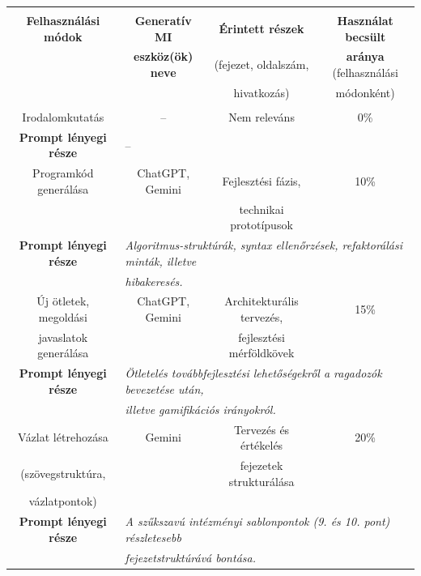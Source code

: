 {\small
	{\noindent
		\begin{tabular}{|c|c|c|c|}\hline
			\hspace{40mm} & \hspace{30mm} & \hspace{30mm} & \hspace{30mm} \\ 
			\textbf{Felhasználási módok}	& \textbf{Generatív MI} 	& \textbf{Érintett részek} 	& \textbf{Használat becsült} \\
			& \textbf{eszköz(ök) neve} & (fejezet, oldalszám, & \textbf{aránya} (felhasználási \\ 
			& & hivatkozás) & módonként) \\
			\hspace{40mm} & \hspace{30mm} & \hspace{30mm} & \hspace{30mm} \\ \hline \hline

			Irodalomkutatás & -- & Nem releváns & 0\% \\ \hline
			\textbf{Prompt lényegi része}  &\multicolumn{3}{|l|}{--} \\ \hline \hline

			Programkód generálása 	& ChatGPT, Gemini 	& Fejlesztési fázis,\newline 	& 10\% \\
								& 				&  technikai prototípusok 	& \\ \hline
			\textbf{Prompt lényegi része } & \multicolumn{3}{|l|}{\textit{Algoritmus-struktúrák, syntax ellenőrzések, refaktorálási minták, illetve}} \\
								& \multicolumn{3}{|l|}{\textit{hibakeresés.}} \\ \hline \hline

			Új ötletek, megoldási 		& ChatGPT, Gemini 	& Architekturális tervezés,	& 15\% 	\\ 
			javaslatok generálása 		& 				& fejlesztési mérföldkövek 	& 		\\ \hline
			\textbf{Prompt lényegi része}  & \multicolumn{3}{|l|}{\textit{Ötletelés továbbfejlesztési lehetőségekről a ragadozók bevezetése után,}} \\
			  					& \multicolumn{3}{|l|}{\textit{illetve gamifikációs irányokról.}} \\ \hline \hline

			Vázlat létrehozása & Gemini & Tervezés és értékelés & 20\% \\
			(szövegstruktúra, & & fejezetek strukturálása & \\ 
			vázlatpontok) & & & \\ \hline
			\textbf{Prompt lényegi része}  &\multicolumn{3}{|l|}{\textit{A szűkszavú intézményi sablonpontok (9. és 10. pont) részletesebb }} \\
								&\multicolumn{3}{|l|}{\textit{fejezetstruktúrává bontása.}} \\ \hline \hline


\end{tabular}}}
